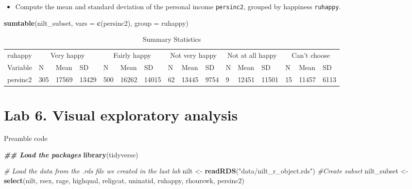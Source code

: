\documentclass[
]{book}
\newenvironment{Shaded}{\begin{snugshade}}{\end{snugshade}}
\newcommand{\AttributeTok}[1]{\textcolor[rgb]{0.13,0.29,0.53}{#1}}
\newcommand{\CommentTok}[1]{\textcolor[rgb]{0.56,0.35,0.01}{\textit{#1}}}
\newcommand{\DocumentationTok}[1]{\textcolor[rgb]{0.56,0.35,0.01}{\textbf{\textit{#1}}}}
\newcommand{\FunctionTok}[1]{\textcolor[rgb]{0.13,0.29,0.53}{\textbf{#1}}}
\newcommand{\NormalTok}[1]{#1}
\newcommand{\OtherTok}[1]{\textcolor[rgb]{0.56,0.35,0.01}{#1}}
\newcommand{\StringTok}[1]{\textcolor[rgb]{0.31,0.60,0.02}{#1}}
\providecommand{\tightlist}{%
  \setlength{\itemsep}{0pt}\setlength{\parskip}{0pt}}
\begin{document}
\begin{itemize}
\tightlist
\item
  Compute the mean and standard deviation of the personal income \texttt{persinc2}, grouped by happiness \texttt{ruhappy}.
\end{itemize}

\begin{Shaded}
\begin{Highlighting}[]
\FunctionTok{sumtable}\NormalTok{(nilt\_subset, }\AttributeTok{vars =} \FunctionTok{c}\NormalTok{(}\StringTok{\textquotesingle{}persinc2\textquotesingle{}}\NormalTok{), }\AttributeTok{group =} \StringTok{\textquotesingle{}ruhappy\textquotesingle{}}\NormalTok{)}
\end{Highlighting}
\end{Shaded}

\begin{table}

\caption{\label{tab:unnamed-chunk-124}Summary Statistics}
\centering
\begin{tabular}[t]{llllllllllllllll}
\toprule
\multicolumn{1}{c}{ruhappy} & \multicolumn{3}{c}{Very happy} & \multicolumn{3}{c}{Fairly happy} & \multicolumn{3}{c}{Not very happy} & \multicolumn{3}{c}{Not at all happy} & \multicolumn{3}{c}{Can't choose} \\
\cmidrule(l{3pt}r{3pt}){1-1} \cmidrule(l{3pt}r{3pt}){2-4} \cmidrule(l{3pt}r{3pt}){5-7} \cmidrule(l{3pt}r{3pt}){8-10} \cmidrule(l{3pt}r{3pt}){11-13} \cmidrule(l{3pt}r{3pt}){14-16}
Variable & N & Mean & SD & N & Mean & SD & N & Mean & SD & N & Mean & SD & N & Mean & SD\\
\midrule
persinc2 & 305 & 17569 & 13429 & 500 & 16262 & 14015 & 62 & 13445 & 9754 & 9 & 12451 & 11501 & 15 & 11457 & 6113\\
\bottomrule
\end{tabular}
\end{table}

\hypertarget{lab-6.-visual-exploratory-analysis}{%
\section{Lab 6. Visual exploratory analysis}\label{lab-6.-visual-exploratory-analysis}}

Preamble code

\begin{Shaded}
\begin{Highlighting}[]
\DocumentationTok{\#\# Load the packages}
\FunctionTok{library}\NormalTok{(tidyverse)}

\CommentTok{\# Load the data from the .rds file we created in the last lab}
\NormalTok{nilt }\OtherTok{\textless{}{-}} \FunctionTok{readRDS}\NormalTok{(}\StringTok{"data/nilt\_r\_object.rds"}\NormalTok{)}
\CommentTok{\#Create subset}
\NormalTok{nilt\_subset }\OtherTok{\textless{}{-}} \FunctionTok{select}\NormalTok{(nilt, rsex, rage, highqual, religcat, uninatid,  ruhappy, rhourswk, persinc2)}
\end{Highlighting}
\end{Shaded}
\end{document}
